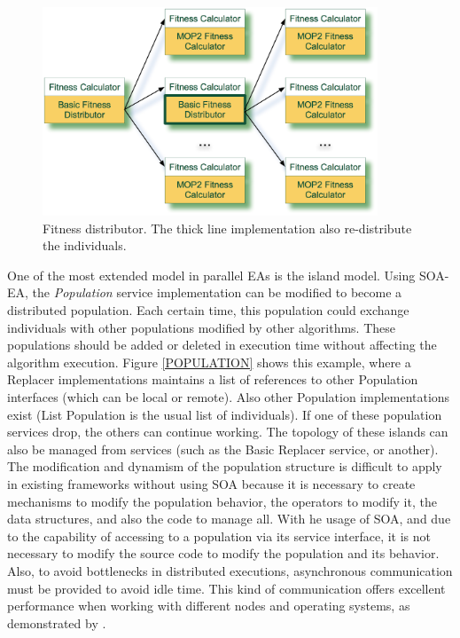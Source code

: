 \begin{figure}
\centering
\includegraphics[width=10cm]{gfx/soaea/distributor.jpg}
\caption{Fitness distributor. The thick line implementation also re-distribute the individuals.}
\label{FITNESSDISTRIBUTOR}
\end{figure}



One of the most extended model in parallel EAs is the island model. Using SOA-EA, the {\em Population} service implementation can be modified to become a distributed population. Each certain time, this population could exchange individuals with other populations modified by other algorithms. These populations should be added or deleted in execution time without affecting the algorithm execution. Figure \ref{POPULATION} shows this example, where a Replacer implementations maintains a list of references to other Population interfaces (which can be local or remote). Also other Population implementations exist (List Population is the usual list of individuals). If one of these population services drop, the others can continue working. The topology of these islands can also be managed from services (such as the Basic Replacer service, or another). The  modification and dynamism of the population structure is difficult to apply in existing frameworks without using SOA because it is necessary to create mechanisms to modify the population behavior, the operators to modify it, the data structures, and also the code to manage all. With he usage of SOA, and due to the capability of accessing to a population via its service interface, it is not necessary to modify the source code to modify the population and its behavior. Also, to avoid bottlenecks in distributed executions, asynchronous communication must be provided to avoid idle time. This kind of communication offers excellent performance when working with different nodes and operating systems, as demonstrated by \cite{HETEROGENEOUS}.



